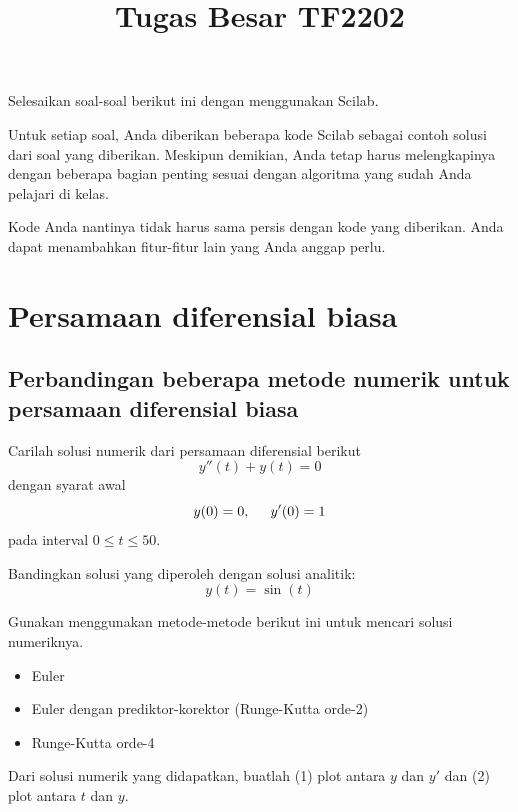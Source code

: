 \documentclass[10pt,bahasa]{article}
\begin{document}
\title{Tugas Besar TF2202}
\date{}
\maketitle

Selesaikan soal-soal berikut ini dengan menggunakan Scilab.

Untuk setiap soal, Anda diberikan beberapa kode Scilab
sebagai contoh solusi dari soal yang diberikan.
Meskipun demikian, Anda tetap harus melengkapinya dengan beberapa
bagian penting sesuai dengan algoritma yang sudah Anda pelajari di kelas.

Kode Anda nantinya tidak harus sama persis dengan kode yang diberikan.
Anda dapat menambahkan fitur-fitur lain yang Anda anggap perlu.


\section{Persamaan diferensial biasa}

\subsection{Perbandingan beberapa metode numerik untuk persamaan diferensial biasa}

Carilah solusi numerik dari persamaan diferensial berikut
\begin{equation}
y''(t) + y(t) = 0
\end{equation}
dengan syarat awal
\begin{equation}
y(0) = 0, \hspace{0.5cm} y'(0) = 1
\end{equation}
pada interval $0 \leq t \leq 50$.

Bandingkan solusi yang diperoleh dengan solusi analitik:
\begin{equation}
y(t) = \sin(t)
\end{equation}

Gunakan menggunakan metode-metode berikut ini untuk mencari solusi numeriknya.
\begin{itemize}
\item Euler
\item Euler dengan prediktor-korektor (Runge-Kutta orde-2)
\item Runge-Kutta orde-4
\end{itemize}

Dari solusi numerik yang didapatkan, buatlah (1) plot antara $y$ dan $y'$
dan (2) plot antara $t$ dan $y$.
\end{document}
